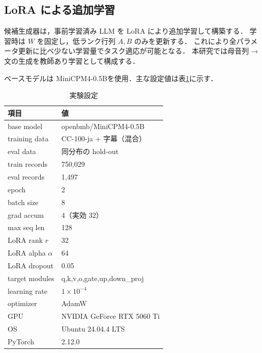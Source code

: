 \subsection{LoRA による追加学習}
候補生成器は，事前学習済み LLM を LoRA により追加学習して構築する．
学習時は $W$ を固定し，低ランク行列 $A, B$ のみを更新する．
これにより全パラメータ更新に比べ少ない学習量でタスク適応が可能となる．
本研究では母音列$\to$文の生成を教師あり学習として構成する．

ベースモデルは MiniCPM4-0.5Bを使用．主な設定値は表\ref{tab:setup}に示す．

\begin{table}[t]
  \centering\small
  \caption{実験設定}
  \label{tab:setup}
  \begin{tabular}{ll}
    \toprule
    項目 & 値 \\
    \midrule
    base model & openbmb/MiniCPM4-0.5B \\
    training data & CC-100-ja + 字幕（混合）\\
    eval data & 同分布の hold-out \\
    train records & 750{,}029\\
    eval records & 1{,}497 \\
    epoch & 2 \\
    batch size & 8 \\
    grad accum & 4（実効 32）\\
    max seq len & 128 \\
    LoRA rank $r$ & 32 \\
    LoRA alpha $\alpha$ & 64 \\
    LoRA dropout & 0.05 \\
    target modules & q,k,v,o,gate,up,down\_proj \\
    learning rate & $1\times10^{-4}$ \\
    optimizer & AdamW \\
    GPU & NVIDIA GeForce RTX 5060 Ti \\
    OS & Ubuntu 24.04.4 LTS \\
    PyTorch & 2.12.0 \\
    \bottomrule
  \end{tabular}
\end{table}

